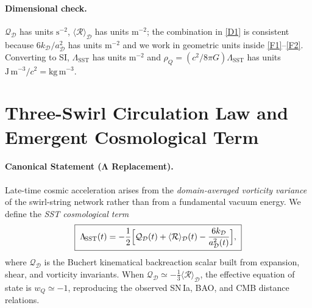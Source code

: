 \documentclass[10pt,reprint,aps,onecolumn,nofootinbib]{revtex4-2}
\begin{document}
    \paragraph{Dimensional check.}
        $\mathcal{Q}_\mathcal{D}$ has units $\mathrm{s^{-2}}$, $\langle \mathcal{R}\rangle_\mathcal{D}$ has units $\mathrm{m^{-2}}$; the combination in \eqref{D1} is consistent because $6k_\mathcal{D}/a_\mathcal{D}^2$ has units $\mathrm{m^{-2}}$ and we work in geometric units inside \eqref{F1}–\eqref{F2}. Converting to SI, $\Lambda_{\!\mathrm{SST}}$ has units $\mathrm{m^{-2}}$ and $\rho_Q=(c^{2}/8\pi G)\Lambda_{\!\mathrm{SST}}$ has units $\mathrm{J\,m^{-3}}/c^{2}=\mathrm{kg\,m^{-3}}$.


    \section{Three-Swirl Circulation Law and Emergent Cosmological Term}
    \label{sec:SST-three-swirl-Lambda}

    \paragraph{Canonical Statement (Λ Replacement).}
        Late-time cosmic acceleration arises from the \emph{domain-averaged vorticity variance}
        of the swirl-string network rather than from a fundamental vacuum energy. We define
        the \emph{SST cosmological term}
        \begin{equation}
        \boxed{\;
        \Lambda_{\!\mathrm{SST}}(t)=
            -\frac{1}{2}\Bigl[\mathcal{Q}_\mathcal{D}(t)+\langle\mathcal{R}\rangle_\mathcal{D}(t)
            -\frac{6k_\mathcal{D}}{a_\mathcal{D}^{2}(t)}\Bigr],
            \;}
        \label{eq:SST-Lambda}
        \end{equation}
        where $\mathcal{Q}_\mathcal{D}$ is the Buchert kinematical backreaction scalar
        \cite{Buchert2000,Buchert2001} built from expansion, shear, and vorticity invariants.
        When $\mathcal{Q}_\mathcal{D}\simeq -\tfrac13\langle\mathcal{R}\rangle_\mathcal{D}$,
        the effective equation of state is $w_Q\simeq-1$, reproducing the observed SN\,Ia,
        BAO, and CMB distance relations.
\end{document}
